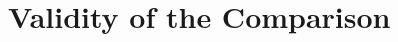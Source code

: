 \section{Validity of the Comparison}\label{sec:validity_of_the_comparison}
\begin{sectionmeta}
\end{sectionmeta}